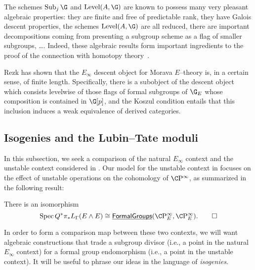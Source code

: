 \begin{remark}
The schemes $\Sub_j \G$ and $\Level(A, \G)$ are known to possess many very pleasant algebraic properties: they are finite and free of predictable rank, they have Galois descent properties, the schemes $\Level(A, \G)$ are all reduced, there are important decompositions coming from presenting a subgroup scheme as a flag of smaller subgroups, \ldots.  Indeed, these algebraic results form important ingredients to the proof of the connection with homotopy theory~\cite[Section 9]{StricklandEthyOfBSigma}.
\end{remark}

\begin{remark}
Rezk has shown that the $E_\infty$ descent object for Morava $E$--theory is, in a certain sense, of finite length.  Specifically, there is a subobject of the descent object which consists levelwise of those flags of formal subgroups of $\G_E$ whose composition is contained in $\G[p]$, and the Koszul condition entails that this inclusion induces a weak equivalence of derived categories.
\end{remark}










\subsection*{Isogenies and the Lubin--Tate moduli}\label{IsogeniesSection}

In this subsection, we seek a comparison of the natural $E_\infty$ context and the unstable context considered in .  Our model for the unstable context in  focuses on the effect of unstable operations on the cohomology of $\CP^\infty$, as summarized in the following result:

\begin{lemma}
There is an isomorphism \[\Spec Q^* \pi_* L_\Gamma(E \sm E) \cong \InternalHom{FormalGroups}(\CP^\infty_E, \CP^\infty_E). \qed\]
\end{lemma}

\noindent In order to form a comparison map between these two contexts, we will want algebraic constructions that trade a subgroup divisor (i.e., a point in the natural $E_\infty$ context) for a formal group endomorphism (i.e., a point in the unstable context).  It will be useful to phrase our ideas in the language of \emph{isogenies}.

